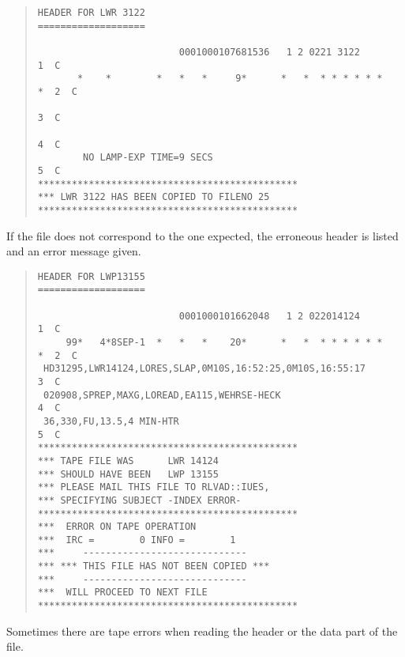 \begin{quote}
{\small
\begin{verbatim}
HEADER FOR LWR 3122
===================

                         0001000107681536   1 2 0221 3122            1  C
       *    *        *   *   *     9*      *   *  * * * * * *     *  2  C
                                                                     3  C
                                                                     4  C
        NO LAMP-EXP TIME=9 SECS                                      5  C
**********************************************
*** LWR 3122 HAS BEEN COPIED TO FILENO 25
**********************************************
\end{verbatim}
}
\end{quote}

If the file does not correspond to the one expected, the erroneous header
is listed and an error message given.

\begin{quote}
{\small
\begin{verbatim}
HEADER FOR LWP13155
===================

                         0001000101662048   1 2 022014124            1  C
     99*   4*8SEP-1  *   *   *    20*      *   *  * * * * * *     *  2  C
 HD31295,LWR14124,LORES,SLAP,0M10S,16:52:25,0M10S,16:55:17           3  C
 020908,SPREP,MAXG,LOREAD,EA115,WEHRSE-HECK                          4  C
 36,330,FU,13.5,4 MIN-HTR                                            5  C
**********************************************
*** TAPE FILE WAS      LWR 14124
*** SHOULD HAVE BEEN   LWP 13155
*** PLEASE MAIL THIS FILE TO RLVAD::IUES,
*** SPECIFYING SUBJECT -INDEX ERROR-
**********************************************
***  ERROR ON TAPE OPERATION
***  IRC =        0 INFO =        1
***     -----------------------------
*** *** THIS FILE HAS NOT BEEN COPIED ***
***     -----------------------------
***  WILL PROCEED TO NEXT FILE
**********************************************
\end{verbatim}
}
\end{quote}

Sometimes there are tape errors when reading the header or the data part of
the file. 


